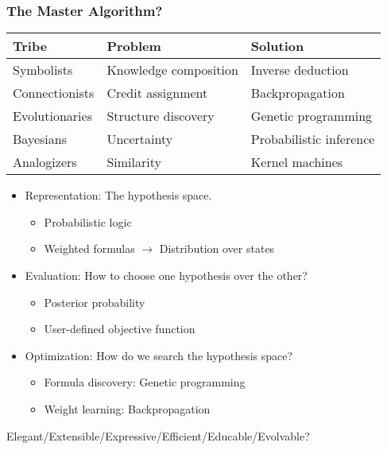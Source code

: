 \documentclass[UTF8,11pt,colorlinks,compress,openany]{beamer}%
\begin{document}
\begin{frame}\frametitle{The Master Algorithm?}
\begin{table}
\begin{tabu}{l|l|l}
\hline
\textbf{Tribe} &\textbf{Problem} &\textbf{Solution}\\
\hline
Symbolists &Knowledge composition &Inverse deduction\\
\hline
Connectionists &Credit assignment &Backpropagation\\
\hline
Evolutionaries &Structure discovery &Genetic programming\\
\hline
Bayesians &Uncertainty &Probabilistic inference\\
\hline
Analogizers &Similarity &Kernel machines\\
\hline
\end{tabu}
\end{table}
\begin{itemize}
	\item Representation: The hypothesis space.
		\begin{itemize}
			\item Probabilistic logic
			\item Weighted formulas $\to$ Distribution over states
		\end{itemize}
	\item Evaluation: How to choose one hypothesis over the other?
		\begin{itemize}
			\item Posterior probability
			\item User-defined objective function
		\end{itemize}
	\item Optimization: How do we search the hypothesis space?
		\begin{itemize}
			\item Formula discovery: Genetic programming
			\item Weight learning: Backpropagation
		\end{itemize}
\end{itemize}
\begin{center}
Elegant/Extensible/Expressive/Efficient/Educable/Evolvable?
\end{center}
\end{frame}
\end{document}
